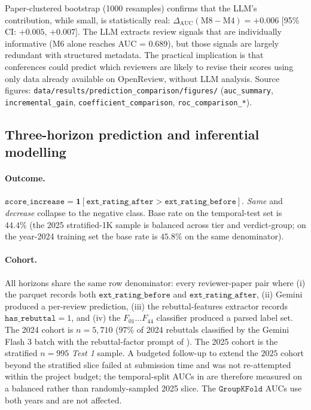\documentclass{article}
\newcommand{\code}[1]{\texttt{#1}}
\begin{document}
Paper-clustered bootstrap (1000 resamples) confirms that the LLM's contribution, while small, is statistically real: $\Delta_{\text{AUC}}(\text{M8} - \text{M4}) = +0.006$ [95\% CI: $+0.005$, $+0.007$]. The LLM extracts review signals that are individually informative (M6 alone reaches AUC = 0.689), but those signals are largely redundant with structured metadata. The practical implication is that conferences could predict which reviewers are likely to revise their scores using only data already available on OpenReview, without LLM analysis. Source figures: \code{data/results/prediction\_comparison/figures/} (\code{auc\_summary}, \code{incremental\_gain}, \code{coefficient\_comparison}, \code{roc\_comparison\_*}).

\subsection{Three-horizon prediction and inferential modelling}\label{app:horizons}

\paragraph{Outcome.} $\code{score\_increase} = \mathbf{1}[\code{ext\_rating\_after} > \code{ext\_rating\_before}]$. \emph{Same} and \emph{decrease} collapse to the negative class. Base rate on the temporal-test set is $44.4\%$ (the 2025 stratified-1K sample is balanced across tier and verdict-group; on the year-2024 training set the base rate is $45.8\%$ on the same denominator).

\paragraph{Cohort.} All horizons share the same row denominator: every reviewer-paper pair where (i) the parquet records both $\code{ext\_rating\_before}$ and $\code{ext\_rating\_after}$, (ii) Gemini produced a per-review prediction, (iii) the rebuttal-features extractor records $\code{has\_rebuttal} = 1$, and (iv) the $F_{01}\ldots F_{44}$ classifier produced a parsed label set. The 2024 cohort is $n=5{,}710$ ($97\%$ of 2024 rebuttals classified by the Gemini Flash 3 batch with the rebuttal-factor prompt of ). The 2025 cohort is the stratified $n=995$ \emph{Test 1} sample. A budgeted follow-up to extend the $2025$ cohort beyond the stratified slice failed at submission time and was not re-attempted within the project budget; the temporal-split AUCs in  are therefore measured on a balanced rather than randomly-sampled 2025 slice. The $\texttt{GroupKFold}$ AUCs use both years and are not affected.
\end{document}
